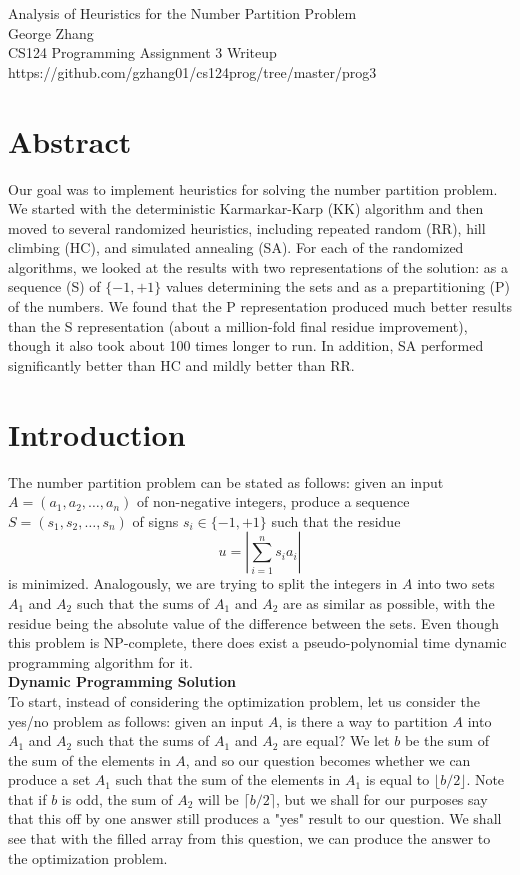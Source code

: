 \documentclass[12pt]{article}
\begin{document}
\begin{center}
Analysis of Heuristics for the Number Partition Problem \\
George Zhang \\
CS124 Programming Assignment 3 Writeup \\
https://github.com/gzhang01/cs124prog/tree/master/prog3 \\
\end{center}

\section{Abstract}
Our goal was to implement heuristics for solving the number partition problem. We started with the deterministic Karmarkar-Karp (KK) algorithm and then moved to several randomized heuristics, including repeated random (RR), hill climbing (HC), and simulated annealing (SA). For each of the randomized algorithms, we looked at the results with two representations of the solution: as a sequence (S) of $\{-1, +1\}$ values determining the sets and as a prepartitioning (P) of the numbers. We found that the P representation produced much better results than the S representation (about a million-fold final residue improvement), though it also took about 100 times longer to run. In addition, SA performed significantly better than HC and mildly better than RR.

\section{Introduction}
The number partition problem can be stated as follows: given an input $A = (a_1, a_2, \dots, a_n)$ of non-negative integers, produce a sequence $S = (s_1, s_2, \dots, s_n)$ of signs $s_i \in \{-1, +1\}$ such that the residue
$$u = \left| \sum_{i = 1}^n s_ia_i \right|$$
is minimized. Analogously, we are trying to split the integers in $A$ into two sets $A_1$ and $A_2$ such that the sums of $A_1$ and $A_2$ are as similar as possible, with the residue being the absolute value of the difference between the sets. Even though this problem is NP-complete, there does exist a pseudo-polynomial time dynamic programming algorithm for it. \\

\textbf{Dynamic Programming Solution} \\
To start, instead of considering the optimization problem, let us consider the yes/no problem as follows: given an input $A$, is there a way to partition $A$ into $A_1$ and $A_2$ such that the sums of $A_1$ and $A_2$ are equal? We let $b$ be the sum of the sum of the elements in $A$, and so our question becomes whether we can produce a set $A_1$ such that the sum of the elements in $A_1$ is equal to $\lfloor b/2 \rfloor$. Note that if $b$ is odd, the sum of $A_2$ will be $\lceil b/2 \rceil$, but we shall for our purposes say that this off by one answer still produces a "yes" result to our question. We shall see that with the filled array from this question, we can produce the answer to the optimization problem. \\
\end{document}
